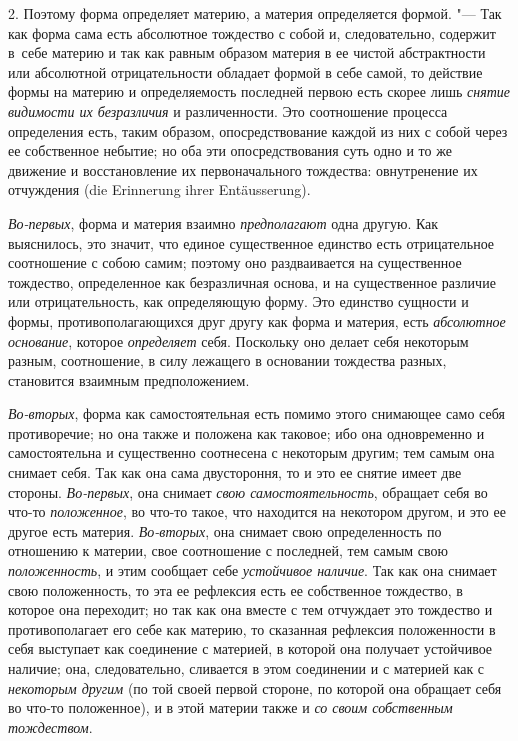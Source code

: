 2. Поэтому форма определяет материю, а материя определяется формой. "--- Так
как форма сама есть абсолютное тождество с собой и, следовательно, содержит
в~себе материю и так как равным образом материя в ее чистой абстрактности или
абсолютной отрицательности обладает формой в себе самой, то действие формы на
материю и определяемость последней первою есть скорее лишь
{\em снятие видимости их безразличия} и различенности. Это соотношение процесса
определения есть, таким образом, опосредствование каждой из них с собой через
ее собственное небытие; но оба эти опосредствования суть одно и то же движение
и восстановление их первоначального тождества: овнутренение их отчуждения (die
Erinne\-rung ihrer Entäus\-se\-rung).

{\em Во-первых}, форма и материя взаимно {\em предполагают} одна другую. Как
выяснилось, это значит, что единое существенное единство есть отрицательное
соотношение с собою самим; поэтому оно раздваивается на существенное тождество,
определенное как безразличная основа, и на существенное различие или
отрицательность, как определяющую форму. Это единство сущности и формы,
противополагающихся друг другу как форма и материя, есть
{\em абсолютное основание}, которое {\em определяет} себя. Поскольку оно делает
себя некоторым разным, соотношение, в силу лежащего в основании тождества
разных, становится взаимным предположением.

{\em Во-вторых}, форма как самостоятельная есть помимо этого снимающее само
себя противоречие; но она также и положена как таковое; ибо она одновременно и
самостоятельна и существенно соотнесена с некоторым другим; тем самым она
снимает себя. Так как она сама двустороння, то и это ее снятие имеет две
стороны. {\em Во-первых}, она снимает {\em свою самостоятельность}, обращает
себя во что-то {\em положенное}, во что-то такое, что находится на некотором
другом, и это ее другое есть материя. {\em Во-вторых}, она снимает свою
определенность по отношению к материи, свое соотношение с последней, тем самым
свою {\em положенность}, и этим сообщает себе {\em устойчивое наличие}. Так как
она снимает свою положенность, то эта ее рефлексия есть ее собственное
тождество, в которое она переходит; но так как она вместе с тем отчуждает это
тождество и противополагает его себе как материю, то сказанная рефлексия
положенности в себя выступает как соединение с материей, в которой она получает
устойчивое наличие; она, следовательно, сливается в этом соединении и с
материей как с {\em некоторым другим} (по той своей первой стороне, по которой
она обращает себя во что-то положенное), и в этой материи также и
{\em со своим собственным тождеством}.

